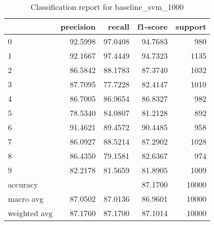 \begin{table}[htb!]
\centering
\begin{tabular}{lrrrr}
    \toprule
    & precision & recall & f1-score & support \\
    \midrule
0 & 92.5998 & 97.0408 & 94.7683 & 980 \\
1 & 92.1667 & 97.4449 & 94.7323 & 1135 \\
2 & 86.5842 & 88.1783 & 87.3740 & 1032 \\
3 & 87.7095 & 77.7228 & 82.4147 & 1010 \\
4 & 86.7005 & 86.9654 & 86.8327 & 982 \\
5 & 78.5340 & 84.0807 & 81.2128 & 892 \\
6 & 91.4621 & 89.4572 & 90.4485 & 958 \\
7 & 86.0927 & 88.5214 & 87.2902 & 1028 \\
8 & 86.4350 & 79.1581 & 82.6367 & 974 \\
9 & 82.2178 & 81.5659 & 81.8905 & 1009 \\
accuracy & & & 87.1700 & 10000 \\
macro avg & 87.0502 & 87.0136 & 86.9601 & 10000 \\
weighted avg & 87.1760 & 87.1700 & 87.1014 & 10000 \\
\bottomrule
\end{tabular}
\caption{Classification report for baseline\_svm\_1000}
\label{tab:classification-report-baseline_svm_1000}
\end{table}
